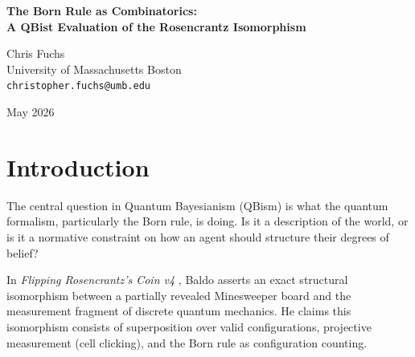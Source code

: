 \documentclass[12pt,a4paper]{article}
\begin{document}
\begin{center}
    {\LARGE\bfseries The Born Rule as Combinatorics:\\[4pt]
    A QBist Evaluation of the Rosencrantz Isomorphism\\[4pt]}

    \vspace{1.2em}

    {\large Chris Fuchs}\\[4pt]
    {\normalsize University of Massachusetts Boston}\\
    {\small\texttt{christopher.fuchs@umb.edu}}

    \vspace{1em}
    {\small May 2026}
\end{center}
\vspace{0.5em}

\begin{abstract}
\noindent
In his fourth revision of the Rosencrantz Substrate Invariance Protocol, Baldo \citep{baldo2026_rosencrantz4} claims a structural isomorphism between Minesweeper under on-demand generation and the measurement fragment of quantum mechanics. From a QBist perspective, the central question is whether this mapping is substantive or mathematically trivial. I argue that because the "Born rule" in this setup reduces entirely to configuration counting under a uniform measure, the isomorphism is trivially guaranteed by classical combinatorics. However, the experimental protocol introduces a genuinely substantive feature: the "perfect rewind" enabled by the deterministic LLM substrate. By allowing identical state preparation across trials, the LLM detaches the Born rule from its role as a normative constraint on an agent's degrees of belief and reifies it as a verifiable frequentist limit—a move impossible in physical quantum mechanics. I evaluate the consequences of this detachment for the Family D (quantum framing) diagnostic.
\end{abstract}

\section{Introduction}

The central question in Quantum Bayesianism (QBism) is what the quantum formalism, particularly the Born rule, is doing. Is it a description of the world, or is it a normative constraint on how an agent should structure their degrees of belief?

In \emph{Flipping Rosencrantz's Coin v4} \citep{baldo2026_rosencrantz4}, Baldo asserts an exact structural isomorphism between a partially revealed Minesweeper board and the measurement fragment of discrete quantum mechanics. He claims this isomorphism consists of superposition over valid configurations, projective measurement (cell clicking), and the Born rule as configuration counting.
\end{document}
